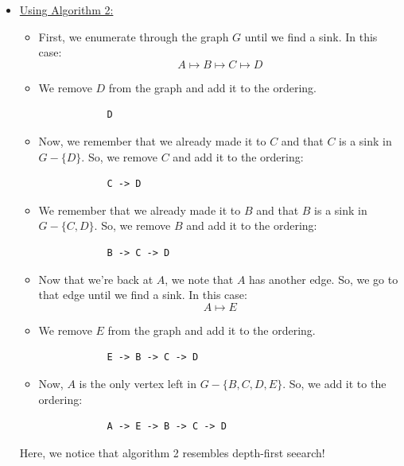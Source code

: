 \documentclass[letterpaper]{article}
\begin{document}
\begin{itemize}
    \item \underline{Using Algorithm 2:}
    \begin{itemize}
        \item First, we enumerate through the graph $G$ until we find a sink. In this case: 
        \[A \mapsto B \mapsto C \mapsto D\]
        \item We remove $D$ from the graph and add it to the ordering. 
        \begin{verbatim}
            D
        \end{verbatim}
        \item Now, we remember that we already made it to $C$ and that $C$ is a sink in $G - \{D\}$. So, we remove $C$ and add it to the ordering: 
        \begin{verbatim}
            C -> D
        \end{verbatim}
        \item We remember that we already made it to $B$ and that $B$ is a sink in $G - \{C, D\}$. So, we remove $B$ and add it to the ordering: 
        \begin{verbatim}
            B -> C -> D
        \end{verbatim}
        \item Now that we're back at $A$, we note that $A$ has another edge. So, we go to that edge until we find a sink. In this case: 
        \[A \mapsto E\]
        \item We remove $E$ from the graph and add it to the ordering. 
        \begin{verbatim}
            E -> B -> C -> D
        \end{verbatim}
        \item Now, $A$ is the only vertex left in $G - \{B, C, D, E\}$. So, we add it to the ordering:
        \begin{verbatim}
            A -> E -> B -> C -> D
        \end{verbatim}
    \end{itemize}
    Here, we notice that algorithm 2 resembles depth-first seearch!
\end{itemize}
\end{document}
